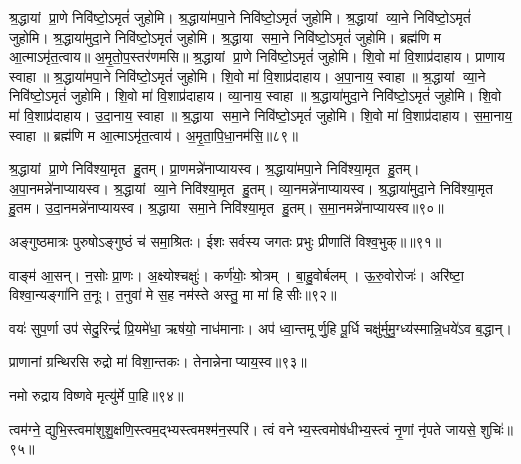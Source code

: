 श्र॒द्धायां प्रा॒णे निवि॑ष्टो॒ऽमृतं॑ जुहोमि। श्र॒द्धाया॑मपा॒ने निवि॑ष्टो॒ऽमृतं॑ जुहोमि। श्र॒द्धायां व्या॒ने निवि॑ष्टो॒ऽमृतं॑ जुहोमि। श्र॒द्धाया॑मुदा॒ने निवि॑ष्टो॒ऽमृतं॑ जुहोमि। श्र॒द्धाया समा॒ने निवि॑ष्टो॒ऽमृतं॑ जुहोमि। ब्रह्म॑णि म आ॒त्माऽमृ॑त॒त्वाय॥ अ॒मृ॒तो॒प॒स्तर॑णमसि॥ श्र॒द्धायां प्रा॒णे निवि॑ष्टो॒ऽमृतं॑ जुहोमि। शि॒वो मा॑ वि॒शाप्र॑दाहाय। प्राणाय स्वाहा॥ श्र॒द्धाया॑मपा॒ने निवि॑ष्टो॒ऽमृतं॑ जुहोमि। शि॒वो मा॑ वि॒शाप्र॑दाहाय। अ॒पा॒नाय॒ स्वाहा॥ श्र॒द्धायां व्या॒ने निवि॑ष्टो॒ऽमृतं॑ जुहोमि। शि॒वो मा॑ वि॒शाप्र॑दाहाय। व्या॒नाय॒ स्वाहा॥ श्र॒द्धाया॑मुदा॒ने निवि॑ष्टो॒ऽमृतं॑ जुहोमि। शि॒वो मा॑ वि॒शाप्र॑दाहाय। उ॒दा॒नाय॒ स्वाहा॥ श्र॒द्धाया समा॒ने निवि॑ष्टो॒ऽमृतं॑ जुहोमि। शि॒वो मा॑ वि॒शाप्र॑दाहाय। स॒मा॒नाय॒ स्वाहा॥ ब्रह्म॑णि म आ॒त्माऽमृ॑त॒त्वाय॑। अ॒मृ॒ता॒पि॒धा॒नम॑सि॒॥८९॥
 \anuvakamend


श्र॒द्धायां प्रा॒णे निवि॑श्या॒मृत हु॒तम्। प्रा॒णमन्ने॑नाप्यायस्व। श्र॒द्धाया॑मपा॒ने निवि॑श्या॒मृत हु॒तम्। अ॒पा॒नमन्ने॑नाप्यायस्व।
श्र॒द्धायां व्या॒ने निवि॑श्या॒मृत हु॒तम्। व्या॒नमन्ने॑नाप्यायस्व। श्र॒द्धाया॑मुदा॒ने निवि॑श्या॒मृत हु॒तम। उ॒दा॒नमन्ने॑नाप्यायस्व।
श्र॒द्धाया समा॒ने निवि॑श्या॒मृत हु॒तम्। स॒मा॒नमन्ने॑नाप्यायस्व॥९०॥\anuvakamend

अङ्गुष्ठमात्रः पुरुषोऽङ्गुष्ठं च॑ समा॒श्रितः। ईशः सर्वस्य जगतः प्रभुः प्रीणाति॑ विश्व॒भुक्॥॥९१॥\anuvakamend

वाङ्म॑ आ॒सन्। न॒सोः प्रा॒णः। अ॒क्ष्योश्चक्षुः॑। कर्ण॑योः॒ श्रोत्रम्। बा॒हु॒वोर्बलम्। ऊ॒रु॒वोरोजः॑। अरि॑ष्टा॒ विश्वा॒न्यङ्गा॑नि त॒नूः। त॒नुवा॑ मे स॒ह नम॑स्ते अस्तु॒ मा मा॑ हिसीः॥९२॥
\anuvakamend

वयः॑ सुप॒र्णा उप॑ सेदु॒रिन्द्रं॑ प्रि॒यमे॑धा॒ ऋष॑यो॒ नाध॑मानाः। अप॑ ध्वा॒न्तमूर्णु॒हि पू॒र्धि चक्षु॑र्मुमु॒ग्ध्य॑स्मान्नि॒धये॑ऽव ब॒द्धान्।\anuvakamend

प्राणानां ग्रन्थिरसि रुद्रो मा॑ विशा॒न्तकः। तेनान्नेनाप्याय॒स्व॥९३॥ \anuvakamend

नमो रुद्राय विष्णवे मृत्यु॑र्मे पा॒हि॥९४॥ \anuvakamend


त्वम॑ग्ने॒ द्युभि॒स्त्वमा॑शुशु॒क्षणि॒स्त्वम॒द्भ्यस्त्वमश्म॑न॒स्परि॑। त्वं वनेभ्य॒स्त्वमोष॑धीभ्य॒स्त्वं नृ॒णां नृ॑पते जायसे॒ शुचिः॑॥९५॥
\anuvakamend

